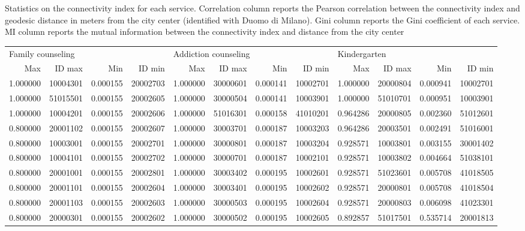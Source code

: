 \documentclass[12pt]{article}
\begin{document}
\begin{table}
	\caption{Statistics on the connectivity index for each service. Correlation column reports the Pearson correlation between the connectivity index and geodesic distance in meters from the city center (identified with Duomo di Milano). Gini column reports the Gini coefficient of each service. MI column reports the mutual information between the connectivity index and distance from the city center}
	\label{statstab}

\end{table}	


\begin{landscape}

	\begin{table}
    \footnotesize
	\centering
		
	

	\begin{tabular}{rrrr|rrrr|rrrr}
		\toprule
		\multicolumn{4}{l}{Family counseling} & \multicolumn{4}{l}{Addiction counseling} & \multicolumn{4}{l}{Kindergarten} \\
		  Max &   ID max &      Min &   ID min &  Max &   ID max &      Min &   ID min &      Max &   ID max &      Min &   ID min \\
		\midrule
		  1.000000 & 10004301 & 0.000155 & 20002703 &  1.000000 & 30000601 & 0.000141 & 10002701 & 1.000000 & 20000804 & 0.000941 & 10002701 \\
		  1.000000 & 51015501 & 0.000155 & 20002605 &  1.000000 & 30000504 & 0.000141 & 10003901 & 1.000000 & 51010701 & 0.000951 & 10003901 \\
		  1.000000 & 10004201 & 0.000155 & 20002606 &  1.000000 & 51016301 & 0.000158 & 41010201 & 0.964286 & 20000805 & 0.002360 & 51012601 \\
		  0.800000 & 20001102 & 0.000155 & 20002607 &  1.000000 & 30003701 & 0.000187 & 10003203 & 0.964286 & 20003501 & 0.002491 & 51016001 \\
		  0.800000 & 10003001 & 0.000155 & 20002701 &  1.000000 & 30000801 & 0.000187 & 10003204 & 0.928571 & 10003801 & 0.003155 & 30001402 \\
		  0.800000 & 10004101 & 0.000155 & 20002702 &  1.000000 & 30000701 & 0.000187 & 10002101 & 0.928571 & 10003802 & 0.004664 & 51038101 \\
		  0.800000 & 20001001 & 0.000155 & 20002801 &  1.000000 & 30003402 & 0.000195 & 10002601 & 0.928571 & 51023601 & 0.005708 & 41018505 \\
		  0.800000 & 20001101 & 0.000155 & 20002604 &  1.000000 & 30003401 & 0.000195 & 10002602 & 0.928571 & 20000801 & 0.005708 & 41018504 \\
		  0.800000 & 20001103 & 0.000155 & 20002603 &  1.000000 & 30000503 & 0.000195 & 10002604 & 0.928571 & 20000803 & 0.006098 & 41023301 \\
		  0.800000 & 20000301 & 0.000155 & 20002602 &  1.000000 & 30000502 & 0.000195 & 10002605 & 0.892857 & 51017501 & 0.535714 & 20001813 \\
		

\end{tabular}
\end{table}
\end{landscape}
\end{document}
